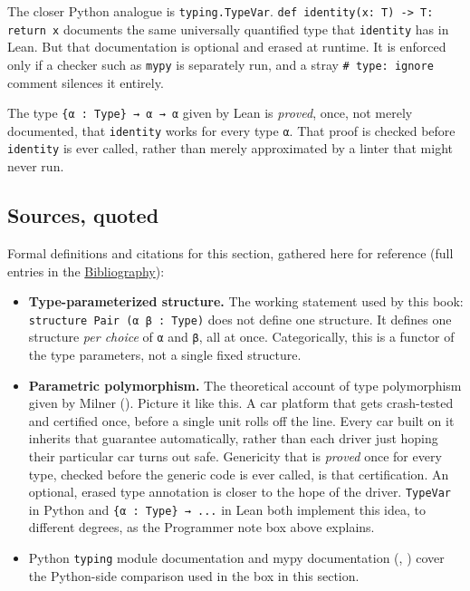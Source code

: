 The closer Python analogue is \texttt{typing.TypeVar}. \texttt{def identity(x: T) -\allowbreak{}> T: return x} documents the same universally quantified type that \texttt{identity} has in Lean. But that documentation is optional and erased at runtime. It is enforced only if a checker such as \texttt{mypy} is separately run, and a stray \texttt{\# type: ignore} comment silences it entirely.

The type \texttt{\{α : Type\} → α → α} given by Lean is \emph{proved}, once, not merely documented, that \texttt{identity} works for every type \texttt{α}. That proof is checked before \texttt{identity} is ever called, rather than merely approximated by a linter that might never run.

\subsection{Sources, quoted}\label{sec:03-functions-and-structures:02-type-parameters:2}

Formal definitions and citations for this section, gathered here for reference (full entries in the \hyperref[sec:root:bibliography:1]{Bibliography}):

\begin{itemize}
\tightlist
\item
  \textbf{Type-parameterized structure.} The working statement used by this book: \texttt{structure Pair (α β : Type)} does not define one structure. It defines one structure \emph{per choice} of \texttt{α} and \texttt{β}, all at once. Categorically, this is a functor of the type parameters, not a single fixed structure.
\item
  \textbf{Parametric polymorphism.} The theoretical account of type polymorphism given by Milner (\cite{Milner1978}). Picture it like this. A car platform that gets crash-tested and certified once, before a single unit rolls off the line. Every car built on it inherits that guarantee automatically, rather than each driver just hoping their particular car turns out safe. Genericity that is \emph{proved} once for every type, checked before the generic code is ever called, is that certification. An optional, erased type annotation is closer to the hope of the driver. \texttt{TypeVar} in Python and \texttt{\{α : Type\} → ...} in Lean both implement this idea, to different degrees, as the Programmer note box above explains.
\item
  Python \texttt{typing} module documentation and mypy documentation (\cite{PythonTyping}, \cite{MypyDocs}) cover the Python-side comparison used in the box in this section.
\end{itemize}
